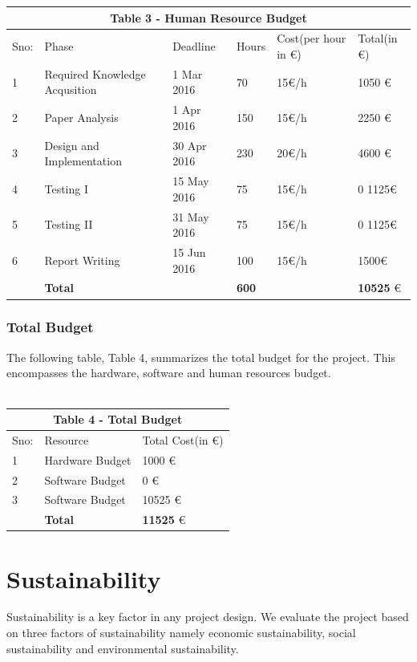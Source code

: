 \begin{tabular}{|p{0.8cm}||p{4cm}|p{2.5cm}|p{1cm}|p{1.5cm}|p{2cm}|}
 \hline
 \multicolumn{6}{|c|}{Table 3 - Human Resource Budget} \\
 \hline
 Sno: & Phase&Deadline &Hours &Cost(per hour in \euro)&Total(in \euro)\\
 \hline
1   & Required Knowledge Acqusition  &1 Mar 2016 &  70  & 15\euro/h & 1050 \euro \\
2   & Paper Analysis  &1 Apr 2016& 150 &  15\euro/h  & 2250 \euro \\
3   & Design and Implementation&30 Apr 2016 &230&  20\euro/h  & 4600 \euro \\
4   & Testing I  &15 May 2016&75 &15\euro/h  & 0 1125\euro \\
5   & Testing II  &31 May 2016&75 &  15\euro/h  & 0 1125\euro \\
6   & Report Writing  &15 Jun 2016&100 &  15\euro/h  & 1500\euro \\
\hline
\hline
   & \textbf{Total}  &  & \textbf{600}&   & \textbf{10525} \euro \\
 \hline
\end{tabular}

\subsubsection{Total Budget}
The following table, Table 4, summarizes the total budget for the project. This encompasses the
hardware, software and human resources budget.
\\ \\ 
\begin{tabular}{|p{1cm}||p{4cm}|p{3cm}|}
 \hline
 \multicolumn{3}{|c|}{Table 4 - Total Budget} \\
 \hline
 Sno: &Resource &Total Cost(in \euro) \\
 \hline
 1   & Hardware Budget  & 1000 \euro \\
 2   & Software Budget  & 0 \euro \\
 3   & Software Budget  & 10525 \euro \\
 \hline
\hline
   & \textbf{Total}  & \textbf{11525} \euro \\
 \hline
 
 

\end{tabular}


\section{Sustainability}
Sustainability is a key factor in any project design. We evaluate the project based on three
factors of sustainability namely economic sustainability, social sustainability and environmental
sustainability.
